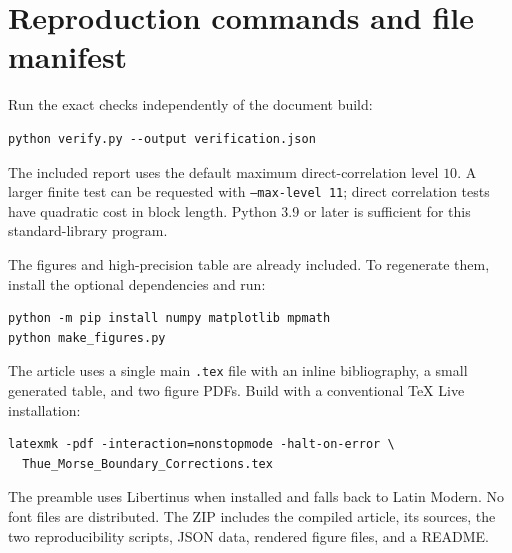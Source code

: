 \documentclass[11pt,a4paper]{article}
\numberwithin{equation}{section}
\theoremstyle{definition}
\theoremstyle{remark}
\begin{document}
\section{Reproduction commands and file manifest}
\label{app:reproduction}
Run the exact checks independently of the document build:
\begin{lstlisting}
python verify.py --output verification.json
\end{lstlisting}
The included report uses the default maximum direct-correlation level $10$.
A larger finite test can be requested with \texttt{--max-level 11}; direct
correlation tests have quadratic cost in block length. Python 3.9 or later is
sufficient for this standard-library program.

The figures and high-precision table are already included. To regenerate them,
install the optional dependencies and run:
\begin{lstlisting}
python -m pip install numpy matplotlib mpmath
python make_figures.py
\end{lstlisting}
The article uses a single main \texttt{.tex} file with an inline bibliography,
a small generated table, and two figure PDFs. Build with a conventional TeX Live
installation:
\begin{lstlisting}
latexmk -pdf -interaction=nonstopmode -halt-on-error \
  Thue_Morse_Boundary_Corrections.tex
\end{lstlisting}
The preamble uses Libertinus when installed and falls back to Latin Modern.
No font files are distributed. The ZIP includes the compiled article, its sources,
the two reproducibility scripts, JSON data, rendered figure files, and a README.
\end{document}
